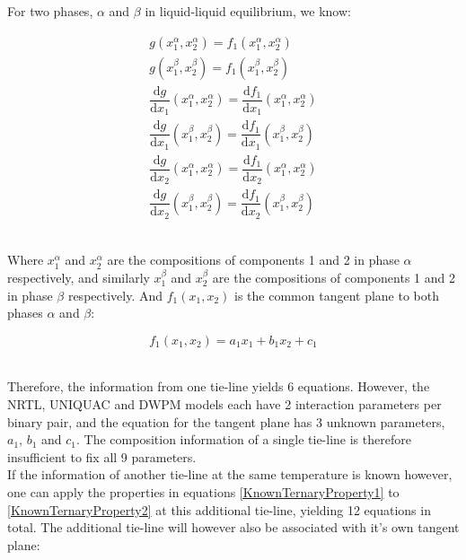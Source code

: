 For two phases, $\alpha$ and $\beta$ in liquid-liquid equilibrium, we know:\

\begin{eqnarray}
g\left(x_{1}^{\alpha}, x_{2}^{\alpha}\right) = f_{1}\left(x_{1}^{\alpha}, x_{2}^{\alpha}\right) \label{KnownTernaryProperty1} \\
g\left(x_{1}^{\beta}, x_{2}^{\beta}\right) = f_{1}\left(x_{1}^{\beta}, x_{2}^{\beta}\right)\\
\dfrac{\mathrm{d} g}{\mathrm{d}x_{1}}\left(x_{1}^{\alpha}, x_{2}^{\alpha}\right) = \dfrac{\mathrm{d} f_{1}}{\mathrm{d}x_{1}}\left(x_{1}^{\alpha}, x_{2}^{\alpha}\right)\\
\dfrac{\mathrm{d} g}{\mathrm{d}x_{1}}\left(x_{1}^{\beta}, x_{2}^{\beta}\right) = \dfrac{\mathrm{d} f_{1}}{\mathrm{d}x_{1}}\left(x_{1}^{\beta}, x_{2}^{\beta}\right)\\
\dfrac{\mathrm{d} g}{\mathrm{d}x_{2}}\left(x_{1}^{\alpha}, x_{2}^{\alpha}\right) = \dfrac{\mathrm{d} f_{1}}{\mathrm{d}x_{2}}\left(x_{1}^{\alpha}, x_{2}^{\alpha}\right)\\
\dfrac{\mathrm{d} g}{\mathrm{d}x_{2}}\left(x_{1}^{\beta}, x_{2}^{\beta}\right) = \dfrac{\mathrm{d} f_{1}}{\mathrm{d}x_{2}}\left(x_{1}^{\beta}, x_{2}^{\beta}\right) \label{KnownTernaryProperty2}
\end{eqnarray}\

Where $x_{1}^{\alpha}$ and $x_{2}^{\alpha}$ are the compositions of components 1 and 2 in phase $\alpha$ respectively, and similarly $x_{1}^{\beta}$ and $x_{2}^{\beta}$ are the compositions of components 1 and 2 in phase $\beta$ respectively. And $f_{1}\left(x_{1}, x_{2}\right)$ is the common tangent plane to both phases $\alpha$ and $\beta$:\

\begin{equation}
f_{1}\left(x_{1}, x_{2}\right) = a_{1}x_{1} + b_{1}x_{2} +c_{1} \label{TangentPlane13D}
\end{equation}\

Therefore, the information from one tie-line yields 6 equations. However, the NRTL, UNIQUAC and DWPM models each have 2 interaction parameters per binary pair, and the equation for the tangent plane has 3 unknown parameters, $a_{1}$, $b_{1}$ and $c_{1}$. The composition information of a single tie-line is therefore insufficient to fix all 9 parameters.\\

If the information of another tie-line at the same temperature is known however, one can apply the properties in equations \ref{KnownTernaryProperty1} to \ref{KnownTernaryProperty2} at this additional tie-line, yielding 12 equations in total. The additional tie-line will however also be associated with it's own tangent plane:\

